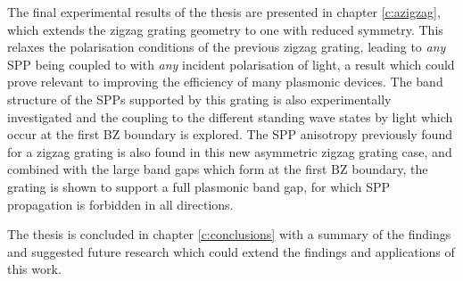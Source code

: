 The final experimental results of the thesis are presented in chapter \ref{c:azigzag}, which extends the zigzag grating geometry to one with reduced symmetry. This relaxes the polarisation conditions of the previous zigzag grating, leading to \textit{any} SPP being coupled to with \textit{any} incident polarisation of light, a result which could prove relevant to improving the efficiency of many plasmonic devices. The band structure of the SPPs supported by this grating is also experimentally investigated and the coupling to the different standing wave states by light which occur at the first BZ boundary is explored. The SPP anisotropy previously found for a zigzag grating is also found in this new asymmetric zigzag grating case, and combined with the large band gaps which form at the first BZ boundary, the grating is shown to support a full plasmonic band gap, for which SPP propagation is forbidden in all directions.

The thesis is concluded in chapter \ref{c:conclusions} with a summary of the findings and suggested future research which could extend the findings and applications of this work.





